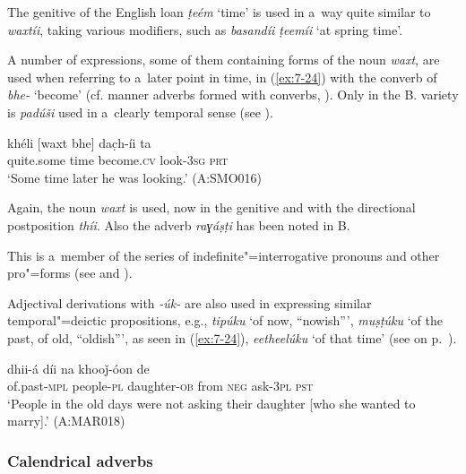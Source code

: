 The genitive of the English loan \textit{ṭeém} `time' is used in a~way quite similar to \textit{waxtíi}, taking various modifiers, such as \textit{basandíi ṭeemíi} `at spring time'.


 A number of expressions, some of them containing forms of the noun \textit{waxt}, are used when referring to a~later point in time, in (\ref{ex:7-24}) with the converb of \textit{bhe-} `become' (cf. manner adverbs formed with converbs, ). Only in the B. variety is \textit{padúši} used in a~clearly temporal sense (see ).

\begin{exe}
\ex
\label{ex:7-24}
\gll khéli [waxt bhe] dac̣h-íi ta \\
quite.some time become.\textsc{cv} look-\textsc{3sg} \textsc{prt}\\
\glt `Some time later he was looking.' (A:SMO016) 
\end{exe}

 Again, the noun \textit{waxt} is used, now in the genitive and with the directional postposition \textit{thíi}. Also the adverb \textit{raɣáṣṭi} has been noted in B.


 This is a~member of the series of
indefinite"=interrogative pronouns and other pro"=forms (see  and
).


Adjectival derivations with \textit{-úk-} are also used in expressing similar temporal"=deictic propositions, e.g., \textit{tipúku} `of now, ``nowish''', \textit{muṣṭúku} `of the past, of old, ``oldish''', as seen in (\ref{ex:7-24}), \textit{eetheelúku} `of that time' (see  on p.~\pageref{tab:7-2}). 

\begin{exe}
\ex
\label{ex:7-25}
 dhii-á díi na khooǰ-óon de \\
of.past-\textsc{mpl} people-\textsc{pl}  daughter-\textsc{ob} from \textsc{neg} ask-\textsc{3pl} \textsc{pst}  \\
\glt `People in the old days were not asking their daughter [who she wanted to marry].' (A:MAR018)
\end{exe}

\subsubsection*{Calendrical adverbs}

